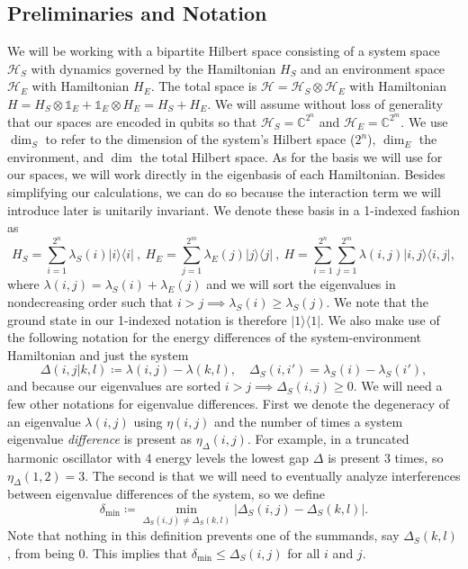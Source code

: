 \documentclass[
 amsmath,amssymb,
 aps,
onecolumn, 
nofootinbib]{revtex4-2}
\newcommand{\ketbra}[2]{| #1\rangle\! \langle #2|}
\newcommand{\hilb}{\mathcal{H}}
\newcommand{\identity}{\mathds{1}}
\begin{document}
\subsection{Preliminaries and Notation} \label{sec:prelim}
We will be working with a bipartite Hilbert space consisting of a system space $\hilb_S$ with dynamics governed by the Hamiltonian $H_S$ and an environment space $\hilb_E$ with Hamiltonian $H_E$. The total space is $\hilb = \hilb_S \otimes \hilb_E$ with Hamiltonian $H = H_S \otimes \identity_E + \identity_E \otimes H_E = H_S + H_E$. We will assume without loss of generality that our spaces are encoded in qubits so that $\hilb_S = \mathbb{C}^{2^n}$ and $\hilb_E = \mathbb{C}^{2^m}$. We use $\dim_S$ to refer to the dimension of the system's Hilbert space ($2^n$), $\dim_E$ the environment, and $\dim$ the total Hilbert space. As for the basis we will use for our spaces, we will work directly in the eigenbasis of each Hamiltonian. Besides simplifying our calculations, we can do so because the interaction term we will introduce later is unitarily invariant. We denote these basis in a 1-indexed fashion as
\begin{equation}
    H_{S} = \sum_{i = 1}^{2^n} \lambda_S(i) \ketbra{i}{i} ~,~ H_{E} = \sum_{j=1}^{2^m } \lambda_E(j) \ketbra{j}{j} ~,~ H = \sum_{i=1}^{2^n } \sum_{j=1}^{2^m } \lambda(i,j) \ketbra{i,j}{i,j},
\end{equation}
where $\lambda(i,j) = \lambda_S(i) + \lambda_E(j)$ and we will sort the eigenvalues in nondecreasing order such that $i > j \implies \lambda_S(i) \geq \lambda_S(j)$. We note that the ground state in our 1-indexed notation is therefore $\ketbra{1}{1}$. We also make use of the following notation for the energy differences of the system-environment Hamiltonian and just the system
\begin{equation}
\Delta(i,j|k,l) \coloneqq \lambda(i,j) - \lambda(k,l), \quad \Delta_S(i,i') = \lambda_S(i) - \lambda_S(i'), \label{eq:delta_def}
\end{equation}
and because our eigenvalues are sorted $i > j \implies \Delta_S(i,j) \geq 0$. We will need a few other notations for eigenvalue differences. First we denote the degeneracy of an eigenvalue $\lambda(i,j)$ using $\eta(i,j)$ and the number of times a system eigenvalue \emph{difference} is present as $\eta_\Delta(i,j)$. For example, in a truncated harmonic oscillator with 4 energy levels the lowest gap $\Delta$ is present 3 times, so $\eta_\Delta(1, 2) = 3$. The second is that we will need to eventually analyze interferences between eigenvalue differences of the system, so we define
\begin{equation}
    \delta_{\min} \coloneqq \min_{\Delta_S(i,j) \neq \Delta_S(k,l)} \left| \Delta_S(i,j) - \Delta_S(k, l) \right|. \label{eq:delta_min_def}
\end{equation}
Note that nothing in this definition prevents one of the summands, say $\Delta_S(k,l)$, from being 0. This implies that $\delta_{\min} \leq \Delta_S(i,j)$ for all $i$ and $j$.
\end{document}
